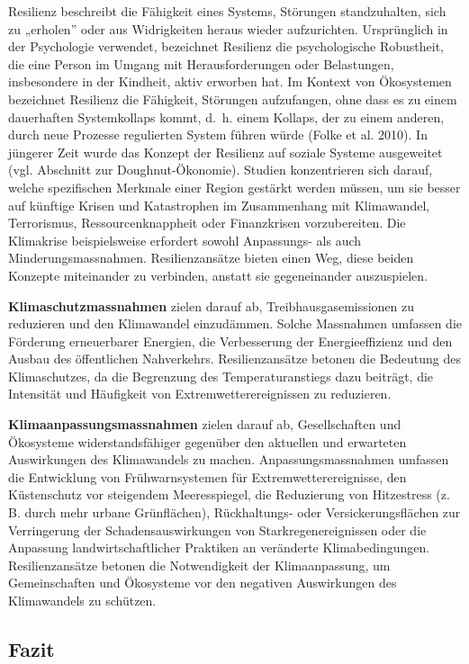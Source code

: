 \documentclass[
  nswissgerman,
  a4paper,
  DIV=11,
  numbers=noendperiod,
  oneside,
  openany]{scrreprt}
\begin{document}
Resilienz beschreibt die Fähigkeit eines Systems, Störungen
standzuhalten, sich zu „erholen'' oder aus Widrigkeiten heraus wieder
aufzurichten. Ursprünglich in der Psychologie verwendet, bezeichnet
Resilienz die psychologische Robustheit, die eine Person im Umgang mit
Herausforderungen oder Belastungen, insbesondere in der Kindheit, aktiv
erworben hat. Im Kontext von Ökosystemen bezeichnet Resilienz die
Fähigkeit, Störungen aufzufangen, ohne dass es zu einem dauerhaften
Systemkollaps kommt, d.~h. einem Kollaps, der zu einem anderen, durch
neue Prozesse regulierten System führen würde (Folke et al. 2010). In
jüngerer Zeit wurde das Konzept der Resilienz auf soziale Systeme
ausgeweitet (vgl. Abschnitt zur Doughnut-Ökonomie). Studien
konzentrieren sich darauf, welche spezifischen Merkmale einer Region
gestärkt werden müssen, um sie besser auf künftige Krisen und
Katastrophen im Zusammenhang mit Klimawandel, Terrorismus,
Ressourcenknappheit oder Finanzkrisen vorzubereiten. Die Klimakrise
beispielsweise erfordert sowohl Anpassungs- als auch
Minderungsmassnahmen. Resilienzansätze bieten einen Weg, diese beiden
Konzepte miteinander zu verbinden, anstatt sie gegeneinander
auszuspielen.

\textbf{Klimaschutz\-massnahmen} zielen darauf ab,
Treibhausgasemissionen zu reduzieren und den Klimawandel einzudämmen.
Solche Massnahmen umfassen die Förderung erneuerbarer Energien, die
Verbesserung der Energieeffizienz und den Ausbau des öffentlichen
Nahverkehrs. Resilienzansätze betonen die Bedeutung des Klimaschutzes,
da die Begrenzung des Temperaturanstiegs dazu beiträgt, die Intensität
und Häufigkeit von Extremwetterereignissen zu reduzieren.

\textbf{Klimaanpassungsmassnahmen} zielen darauf ab, Gesellschaften und
Ökosysteme widerstandsfähiger gegenüber den aktuellen und erwarteten
Auswirkungen des Klimawandels zu machen. Anpassungsmassnahmen umfassen
die Entwicklung von Frühwarnsystemen für Extremwetterereignisse, den
Küstenschutz vor steigendem Meeresspiegel, die Reduzierung von
Hitzestress (z. B. durch mehr urbane Grünflächen), Rückhaltungs- oder
Versickerungsflächen zur Verringerung der Schadensauswirkungen von
Starkregenereignissen oder die Anpassung landwirtschaftlicher Praktiken
an veränderte Klimabedingungen. Resilienzansätze betonen die
Notwendigkeit der Klimaanpassung, um Gemeinschaften und Ökosysteme vor
den negativen Auswirkungen des Klimawandels zu schützen.

\subsection{Fazit}\label{fazit}
\end{document}
